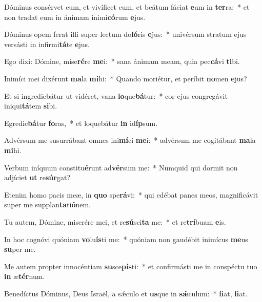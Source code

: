 \item Dóminus consérvet eum, et vivíficet eum, et beátum fáciat \textbf{e}um in \textbf{ter}ra:~* et non tradat eum in ánimam inimi\textbf{có}rum \textbf{e}jus.
\item Dóminus opem ferat illi super lectum do\textbf{ló}ris \textbf{e}jus:~* univérsum stratum ejus versásti in infirmi\textbf{tá}te \textbf{e}jus.
\item Ego dixi: Dómine, mise\textbf{ré}re \textbf{me}i:~* sana ánimam meam, quia pec\textbf{cá}vi \textbf{ti}bi.
\item Inimíci mei dixérunt \textbf{ma}la \textbf{mi}hi:~* Quando moriétur, et períbit \textbf{no}men \textbf{e}jus?
\item Et si ingrediebátur ut vidéret, vana \textbf{lo}que\textbf{bá}tur:~* cor ejus congregávit iniqui\textbf{tá}tem \textbf{si}bi.
\item Egredie\textbf{bá}tur \textbf{fo}ras,~* et loquebátur \textbf{in} id\textbf{íp}sum.
\item Advérsum me susurrábant omnes ini\textbf{mí}ci \textbf{me}i:~* advérsum me cogitábant \textbf{ma}la \textbf{mi}hi.
\item Verbum iníquum constitu\textbf{é}runt ad\textbf{vér}sum me:~* Numquid qui dormit non adjíciet \textbf{ut} re\textbf{súr}gat?
\item Etenim homo pacis meæ, in \textbf{quo} spe\textbf{rá}vi:~* qui edébat panes meos, magnificávit super me supplan\textbf{ta}ti\textbf{ó}nem.
\item Tu autem, Dómine, miserére mei, et re\textbf{sú}sci\textbf{ta} me:~* et re\textbf{trí}buam \textbf{e}is.
\item In hoc cognóvi quóniam \textbf{vo}lu\textbf{ís}ti me:~* quóniam non gaudébit inimícus \textbf{me}us \textbf{su}per me.
\item Me autem propter innocéntiam \textbf{su}sce\textbf{pís}ti:~* et confirmásti me in conspéctu tuo \textbf{in} æ\textbf{tér}num.
\item Benedíctus Dóminus, Deus Israël, a sǽculo et \textbf{us}que in \textbf{sǽ}culum:~* \textbf{fi}at, \textbf{fi}at.

